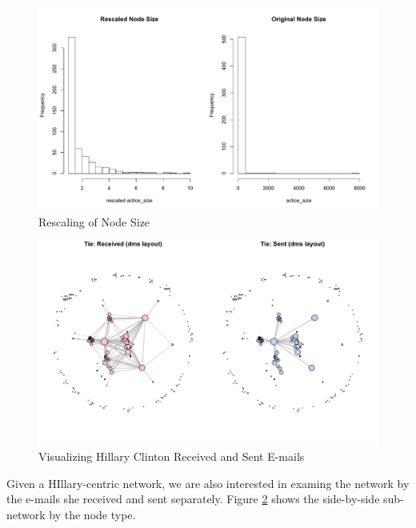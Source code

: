 \begin{figure}[ht]
\centering
\includegraphics[width=.9\textwidth]{zoe/report_rescaled_size}
\caption{Rescaling of Node Size}
\label{fig:rescalenode}
\end{figure}

\begin{figure}[ht]
\centering
\includegraphics[width=.9\textwidth]{zoe/report_network_compare}
\caption{Visualizing Hillary Clinton Received and Sent E-mails}
\label{fig:splitnw}
\end{figure}

Given a HIllary-centric network, we are also interested in examing the network by the e-mails she received and sent separately. Figure \ref{fig:splitnw} shows the side-by-side sub-network by the node type.
